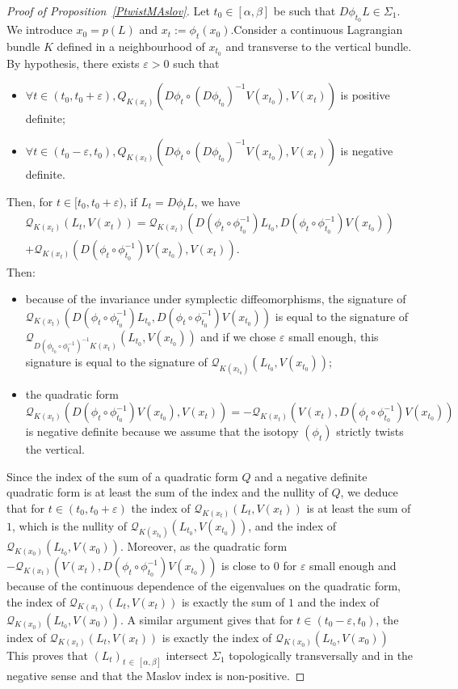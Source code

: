 \documentclass[10pt,a4paper]{amsart}
\numberwithin{equation}{section}
\newcommand*\cq{\mathcal{Q}}
\let\oldforall\forall
\renewcommand*{\forall}{\mathrel{\oldforall}}
\theoremstyle{definition}
\theoremstyle{remark}
\begin{document}
\begin{proof}[Proof of Proposition~\ref{PtwistMAslov}]
Let $t_0\in [\alpha, \beta]$ be such that $D\phi_{t_0}L\in \Sigma_1$. We introduce $x_0=p(L)$ and $x_t:=\phi_t(x_0)$.\linebreak Consider a continuous Lagrangian bundle $K$ defined in a neighbourhood of $x_{t_0}$ and transverse to the vertical bundle. By hypothesis, there exists $\varepsilon>0$ such that
\begin{itemize}
\item $\forall t\in (t_0, t_0+\varepsilon), Q_{K(x_t)}(D\phi_t\circ (D\phi_{t_0})^{-1}V(x_{t_0}), V(x_t))$ is positive definite;
\item $\forall t\in (t_0-\varepsilon, t_0), Q_{K(x_t)}(D\phi_t\circ (D\phi_{t_0})^{-1}V(x_{t_0}), V(x_t))$ is negative definite.
\end{itemize}
Then, for $t\in [t_0, t_0+\varepsilon)$, if $L_t=D\phi_tL$, we have
\begin{multline*}
\cq_{K(x_t)}(L_t, V(x_t))=
\cq_{K(x_t)}\left(D\left(\phi_t\circ \phi_{t_0}^{-1}\right)L_{t_0}, D\left(\phi_t\circ \phi_{t_0}^{-1}\right)V(x_{t_0})\right)\\+\cq_{K(x_t)}\left(D\left(\phi_t\circ \phi_{t_0}^{-1}\right)V(x_{t_0}), V(x_t)\right).
\end{multline*}
Then:
\begin{itemize}
\item because of the invariance under symplectic diffeomorphisms, the signature of $\cq_{K(x_t)}(D(\phi_t\circ \phi_{t_0}^{-1})L_{t_0}, D(\phi_t\circ \phi_{t_0}^{-1})V(x_{t_0}))$ is equal to the signature of $\cq_{D(\phi_{t_0}\circ \phi_{t}^{-1})^{-1}K(x_t)}(L_{t_0}, V(x_{t_0}))$ and if we chose $\varepsilon$ small enough, this signature is equal to the signature of $\cq_{K(x_{t_0})}(L_{t_0}, V(x_{t_0}))$;
\item the quadratic form
\[
\cq_{K(x_t)}\left(D\left(\phi_t\circ \phi_{t_0}^{-1}\right)V(x_{t_0}), V(x_t)\right)=-\cq_{K(x_t)}\left(V(x_t), D\left(\phi_t\circ \phi_{t_0}^{-1}\right)V(x_{t_0})\right)
\]
is negative definite because we assume that the isotopy $(\phi_t)$ strictly twists the vertical.
\end{itemize}
Since the index of the sum of a quadratic form $Q$ and a negative {definite} quadratic form is at least  the sum of the index and the nullity of $Q$, we deduce that for $t\in (t_0, t_0+\varepsilon)$ the index of $\cq_{K(x_t)}(L_t, V(x_t))$ is at least the  sum of $1$, which is the nullity of $\cq_{K(x_{t_0})}(L_{t_0},V(x_{t_0}))$, and the index of $\cq_{K(x_0)}(L_{t_0}, V(x_0))$. { Moreover, as the quadratic form $-\cq_{K(x_t)}(V(x_t), D(\phi_t\circ \phi_{t_0}^{-1})V(x_{t_0}))$ is close to $0$ for $\varepsilon$ small enough and because of the continuous dependence of the eigenvalues on the quadratic form, the index of $\cq_{K(x_t)}(L_t, V(x_t))$ is exactly the sum of $1$ and the index of $\cq_{K(x_0)}(L_{t_0}, V(x_0))$.} A similar argument gives that for $t\in (t_0-\varepsilon, t_0)$, the index of $\cq_{K(x_t)}(L_t, V(x_t))$ is {exactly} the index of $\cq_{K(x_0)}(L_{t_0}, V(x_0))$ This proves that $(L_t)_{t\,\in\,[\alpha, \beta]}$ intersect $\Sigma_1$ { topologically} transversally and in the negative sense and that the Maslov index is non-positive.\newline

\end{proof}
\end{document}
